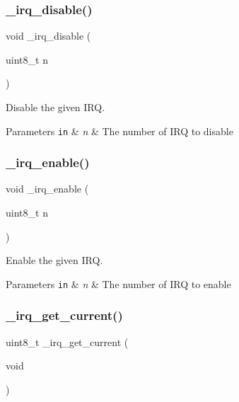 \subsubsection{\texorpdfstring{\+\_\+irq\+\_\+disable()}{\_irq\_disable()}}
{\footnotesize\ttfamily void \+\_\+irq\+\_\+disable (\begin{DoxyParamCaption}\item[{uint8\+\_\+t}]{n }\end{DoxyParamCaption})}



Disable the given I\+RQ. 


\begin{DoxyParams}[1]{Parameters}
\mbox{\tt in}  & {\em n} & The number of I\+RQ to disable \\
\hline
\end{DoxyParams}
\mbox{\label{group___h_p_l_gac8b7aa49ad81aecd34603b4dc23dd143}} 
\subsubsection{\texorpdfstring{\+\_\+irq\+\_\+enable()}{\_irq\_enable()}}
{\footnotesize\ttfamily void \+\_\+irq\+\_\+enable (\begin{DoxyParamCaption}\item[{uint8\+\_\+t}]{n }\end{DoxyParamCaption})}



Enable the given I\+RQ. 


\begin{DoxyParams}[1]{Parameters}
\mbox{\tt in}  & {\em n} & The number of I\+RQ to enable \\
\hline
\end{DoxyParams}
\mbox{\label{group___h_p_l_ga082e8d19d78ab2cf2f63ded8530c7852}} 
\subsubsection{\texorpdfstring{\+\_\+irq\+\_\+get\+\_\+current()}{\_irq\_get\_current()}}
{\footnotesize\ttfamily uint8\+\_\+t \+\_\+irq\+\_\+get\+\_\+current (\begin{DoxyParamCaption}\item[{void}]{ }\end{DoxyParamCaption})}



